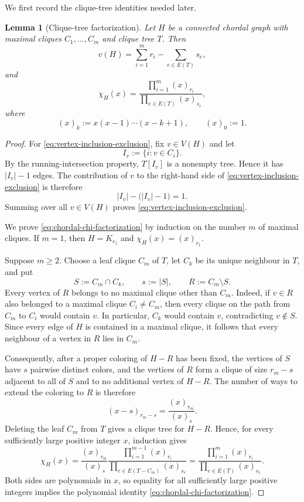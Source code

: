 \documentclass[11pt]{article}
\newtheorem{lemma}[lemma]{Lemma}
\numberwithin{equation}{section}
\begin{document}
We first record the clique-tree identities needed later.

\begin{lemma}[Clique-tree factorization]\label{lem:factorization}
Let $H$ be a connected chordal graph with maximal cliques
$C_1,\dots,C_m$ and clique tree $T$.  Then
\begin{equation}
 v(H)
 =
 \sum_{i=1}^m r_i
 -
 \sum_{e\in E(T)}s_e,\label{eq:vertex-inclusion-exclusion}
\end{equation}
and
\begin{equation}
 \chi_H(x)
 =
 \frac{\prod_{i=1}^m (x)_{r_i}}
      {\prod_{e\in E(T)}(x)_{s_e}},\label{eq:chordal-chi-factorization}
\end{equation}
where
\[
 (x)_k:=x(x-1)\cdots(x-k+1),
 \qquad
 (x)_0:=1.
\]
\end{lemma}

\begin{proof}
For \eqref{eq:vertex-inclusion-exclusion}, fix $v\in V(H)$ and let
\[
 I_v:=\{i:v\in C_i\}.
\]
By the running-intersection property, $T[I_v]$ is a nonempty tree.  Hence
it has $|I_v|-1$ edges.  The contribution of $v$ to the right-hand side
of \eqref{eq:vertex-inclusion-exclusion} is therefore
\[
 |I_v|-\bigl(|I_v|-1\bigr)=1.
\]
Summing over all $v\in V(H)$ proves
\eqref{eq:vertex-inclusion-exclusion}.

We prove \eqref{eq:chordal-chi-factorization} by induction on the number
$m$ of maximal cliques.  If $m=1$, then $H=K_{r_1}$ and
$\chi_H(x)=(x)_{r_1}$.

Suppose $m\geq2$.  Choose a leaf clique $C_m$ of $T$, let $C_k$ be its
unique neighbour in $T$, and put
\[
 S:=C_m\cap C_k,
 \qquad
 s:=|S|,
 \qquad
 R:=C_m\setminus S.
\]
Every vertex of $R$ belongs to no maximal clique other than $C_m$.
Indeed, if $v\in R$ also belonged to a maximal clique $C_i\neq C_m$,
then every clique on the path from $C_m$ to $C_i$ would contain $v$.
In particular, $C_k$ would contain $v$, contradicting $v\notin S$.
Since every edge of $H$ is contained in a maximal clique, it follows that
every neighbour of a vertex in $R$ lies in $C_m$.

Consequently, after a proper coloring of $H-R$ has been fixed, the
vertices of $S$ have $s$ pairwise distinct colors, and the vertices of
$R$ form a clique of size $r_m-s$ adjacent to all of $S$ and to no
additional vertex of $H-R$.  The number of ways to extend the coloring
to $R$ is therefore
\[
 (x-s)_{r_m-s}
 =
 \frac{(x)_{r_m}}{(x)_s}.
\]
Deleting the leaf $C_m$ from $T$ gives a clique tree for $H-R$.  Hence,
for every sufficiently large positive integer $x$, induction gives
\[
 \chi_H(x)
 =
 \frac{(x)_{r_m}}{(x)_s}
 \frac{\prod_{i=1}^{m-1}(x)_{r_i}}
      {\prod_{e\in E(T-C_m)}(x)_{s_e}}
 =
 \frac{\prod_{i=1}^m(x)_{r_i}}
      {\prod_{e\in E(T)}(x)_{s_e}}.
\]
Both sides are polynomials in $x$, so equality for all sufficiently large
positive integers implies the polynomial identity
\eqref{eq:chordal-chi-factorization}.
\end{proof}
\end{document}
